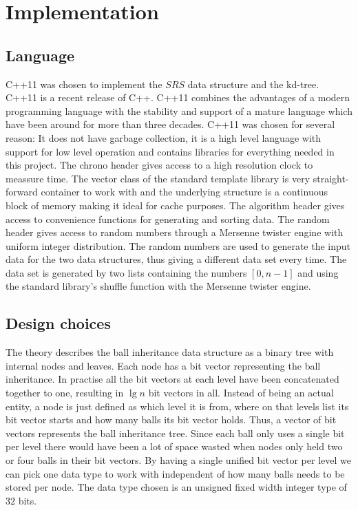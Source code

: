 \chapter{Implementation}

\section{Language}

C++11 was chosen to implement the $SRS$ data structure and the kd-tree. C++11 is a recent release of C++. C++11 combines the advantages of a modern programming language with the stability and support of a mature language which have been around for more than three decades. C++11 was chosen for several reason: It does not have garbage collection, it is a high level language with support for low level operation and contains libraries for everything needed in this project. The chrono header gives access to a high resolution clock to meassure time. The vector class of the standard template library is very straight-forward container to work with and the underlying structure is a continuous block of memory making it ideal for cache purposes. The algorithm header gives access to convenience functions for generating and sorting data. The random header gives access to random numbers through a Mersenne twister engine with uniform integer distribution. The random numbers are used to generate the input data for the two data structures, thus giving a different data set every time. The data set is generated by two lists containing the numbers $[0,n-1]$ and using the standard library's shuffle function with the Mersenne twister engine. 

\section{Design choices}

The theory describes the ball inheritance data structure as a binary tree with internal nodes and leaves. Each node has a bit vector representing the ball inheritance. In practise all the bit vectors at each level have been concatenated together to one, resulting in $\lg n$ bit vectors in all. Instead of being an actual entity, a node is just defined as which level it is from, where on that levels list its bit vector starts and how many balls its bit vector holds. Thus, a vector of bit vectors represents the ball inheritance tree. Since each ball only uses a single bit per level there would have been a lot of space wasted when nodes only held two or four balls in their bit vectors. By having a single unified bit vector per level we can pick one data type to work with independent of how many balls needs to be stored per node. The data type chosen is an unsigned fixed width integer type of $32$ bits.

